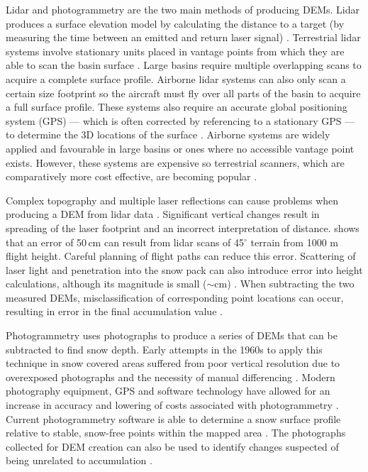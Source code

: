 \documentclass{sfuthesis}
\begin{document}
\begin{appendices}
Lidar and photogrammetry are the two main methods of producing DEMs. Lidar produces a surface elevation model by calculating the distance to a target (by measuring the time between an emitted and return laser signal) \citep{Deems2006, Sold2013}. Terrestrial lidar systems involve stationary units placed in vantage points from which they are able to scan the basin surface \citep{Grunewald2010}. Large basins require multiple overlapping scans to acquire a complete surface profile. Airborne lidar systems can also only scan a certain size footprint so the aircraft must fly over all parts of the basin to acquire a full surface profile. These systems also require an accurate global positioning system (GPS) --- which is often corrected by referencing to a stationary GPS --- to determine the 3D locations of the surface \citep{Deems2006}. Airborne systems are widely applied and favourable in large basins or ones where no accessible vantage point exists. However, these systems are expensive so terrestrial scanners, which are comparatively more cost effective, are becoming popular \citep{Grunewald2010}. 

Complex topography and multiple laser reflections can cause problems when producing a DEM from lidar data \citep{Deems2006}. Significant vertical changes result in spreading of the laser footprint and an incorrect interpretation of distance. \cite{Deems2006} shows that an error of 50\,cm can result from lidar scans of 45$^\circ$ terrain from 1000 m flight height. Careful planning of flight paths can reduce this error. Scattering of laser light and penetration into the snow pack can also introduce error into height calculations, although its magnitude is small ($\sim$cm) \citep{Deems2006}. When subtracting the two measured DEMs, misclassification of corresponding point locations can occur, resulting in error in the final accumulation value \citep{Deems2006}.  

Photogrammetry uses photographs to produce a series of DEMs that can be subtracted to find snow depth. Early attempts in the 1960s to apply this technique in snow covered areas suffered from poor vertical resolution due to overexposed photographs and the necessity of manual differencing \citep{Nolan2015}. Modern photography equipment, GPS and software technology have allowed for an increase in accuracy and lowering of costs associated with photogrammetry \citep{Nolan2015}. Current photogrammetry software is able to determine a snow surface profile relative to stable, snow-free points within the mapped area \citep{Farinotti2010}. The photographs collected for DEM creation can also be used to identify changes suspected of being unrelated to accumulation \citep{Nolan2015}.


\end{appendices}
\end{document}
